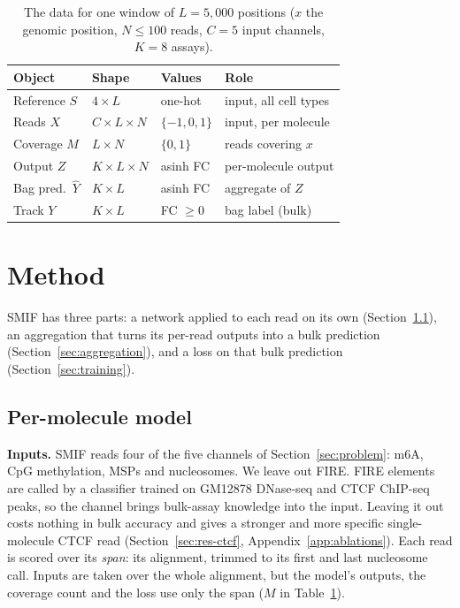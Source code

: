 \documentclass[acmtog,nonacm]{acmart}   %
\begin{document}
\begin{table}[t]
\caption{The data for one window of $L=5{,}000$ positions ($x$ the genomic position, $N\le100$ reads, $C=5$
input channels, $K=8$ assays).}
\label{tab:data}
\small
\begin{tabular}{@{}llll@{}}
\toprule
Object & Shape & Values & Role \\
\midrule
Reference $S$ & $4\times L$ & one-hot & input, all cell types \\
Reads $X$ & $C\times L\times N$ & $\{-1,0,1\}$ & input, per molecule \\
Coverage $M$ & $L\times N$ & $\{0,1\}$ & reads covering $x$ \\
Output $Z$ & $K\times L\times N$ & asinh FC & per-molecule output \\
Bag pred.\ $\hat Y$ & $K\times L$ & asinh FC & aggregate of $Z$ \\
Track $Y$ & $K\times L$ & FC $\ge0$ & bag label (bulk) \\
\bottomrule
\end{tabular}
\end{table}

\section{Method}
\label{sec:method}

SMIF has three parts: a network applied to each read on its own (Section~\ref{sec:model}), an aggregation that
turns its per-read outputs into a bulk prediction (Section~\ref{sec:aggregation}), and a loss on that bulk
prediction (Section~\ref{sec:training}).

\subsection{Per-molecule model}
\label{sec:model}

\textbf{Inputs.} SMIF reads four of the five channels of Section~\ref{sec:problem}: m6A, CpG methylation, MSPs and
nucleosomes. We leave out FIRE. FIRE elements are called by a classifier trained on GM12878 DNase-seq and CTCF
ChIP-seq peaks, so the channel brings bulk-assay knowledge into the input. Leaving it out costs nothing in bulk
accuracy and gives a stronger and more specific single-molecule CTCF read (Section~\ref{sec:res-ctcf},
Appendix~\ref{app:ablations}). Each
read is scored over its \emph{span}: its alignment, trimmed to its first and last nucleosome call. Inputs are taken
over the whole alignment, but the model's outputs, the coverage count and the loss use only the span ($M$ in
Table~\ref{tab:data}).
\end{document}
